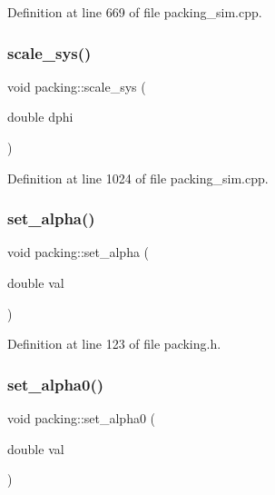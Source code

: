 Definition at line 669 of file packing\+\_\+sim.\+cpp.

\mbox{\label{classpacking_a16f87413335e58b0ac9a9ded8742f32b}} 
\subsubsection{\texorpdfstring{scale\+\_\+sys()}{scale\_sys()}}
{\footnotesize\ttfamily void packing\+::scale\+\_\+sys (\begin{DoxyParamCaption}\item[{double}]{dphi }\end{DoxyParamCaption})}



Definition at line 1024 of file packing\+\_\+sim.\+cpp.

\mbox{\label{classpacking_aa80ff9c4b9ec36807a0d42ce28f50d2a}} 
\subsubsection{\texorpdfstring{set\+\_\+alpha()}{set\_alpha()}}
{\footnotesize\ttfamily void packing\+::set\+\_\+alpha (\begin{DoxyParamCaption}\item[{double}]{val }\end{DoxyParamCaption})\hspace{0.3cm}{\ttfamily [inline]}}



Definition at line 123 of file packing.\+h.

\mbox{\label{classpacking_a33a628e0d2d7bcaa72f6a205a3244e76}} 
\subsubsection{\texorpdfstring{set\+\_\+alpha0()}{set\_alpha0()}}
{\footnotesize\ttfamily void packing\+::set\+\_\+alpha0 (\begin{DoxyParamCaption}\item[{double}]{val }\end{DoxyParamCaption})\hspace{0.3cm}{\ttfamily [inline]}}



